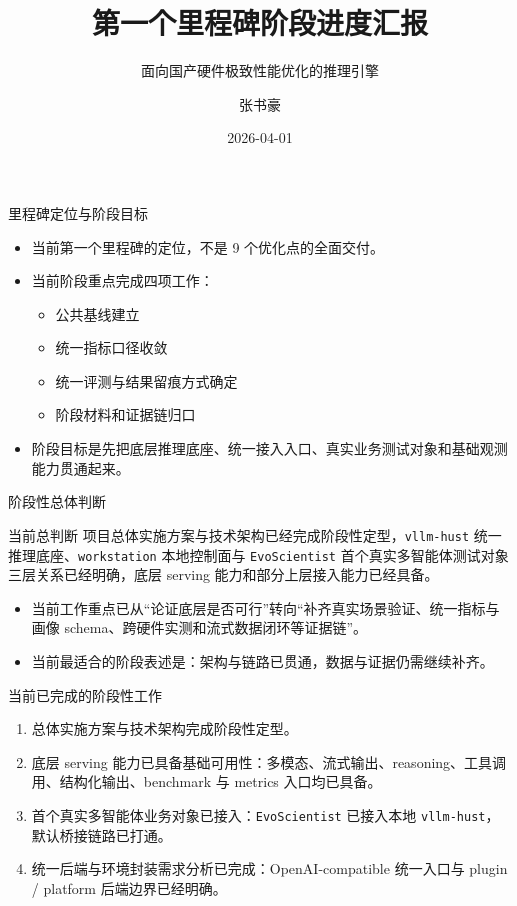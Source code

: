 \documentclass[aspectratio=169,11pt]{ctexbeamer}
\title{第一个里程碑阶段进度汇报}
\subtitle{面向国产硬件极致性能优化的推理引擎}
\author{张书豪}
\date{2026-04-01}
\begin{document}
\begin{frame}
  \titlepage
\end{frame}

\begin{frame}{里程碑定位与阶段目标}
  \begin{itemize}
    \item 当前第一个里程碑的定位，不是 9 个优化点的全面交付。
    \item 当前阶段重点完成四项工作：
      \begin{itemize}
        \item 公共基线建立
        \item 统一指标口径收敛
        \item 统一评测与结果留痕方式确定
        \item 阶段材料和证据链归口
      \end{itemize}
    \item 阶段目标是先把底层推理底座、统一接入入口、真实业务测试对象和基础观测能力贯通起来。
  \end{itemize}
\end{frame}

\begin{frame}{阶段性总体判断}
  \begin{block}{当前总判断}
    项目总体实施方案与技术架构已经完成阶段性定型，\texttt{vllm-hust} 统一推理底座、\texttt{workstation} 本地控制面与 \texttt{EvoScientist} 首个真实多智能体测试对象三层关系已经明确，底层 serving 能力和部分上层接入能力已经具备。
  \end{block}

  \vspace{0.5em}
  \begin{itemize}
    \item 当前工作重点已从“论证底层是否可行”转向“补齐真实场景验证、统一指标与画像 schema、跨硬件实测和流式数据闭环等证据链”。
    \item 当前最适合的阶段表述是：架构与链路已贯通，数据与证据仍需继续补齐。
  \end{itemize}
\end{frame}

\begin{frame}{当前已完成的阶段性工作}
  \begin{enumerate}
    \item 总体实施方案与技术架构完成阶段性定型。
    \item 底层 serving 能力已具备基础可用性：多模态、流式输出、reasoning、工具调用、结构化输出、benchmark 与 metrics 入口均已具备。
    \item 首个真实多智能体业务对象已接入：\texttt{EvoScientist} 已接入本地 \texttt{vllm-hust}，默认桥接链路已打通。
    \item 统一后端与环境封装需求分析已完成：OpenAI-compatible 统一入口与 plugin / platform 后端边界已经明确。
  \end{enumerate}
\end{frame}
\end{document}
